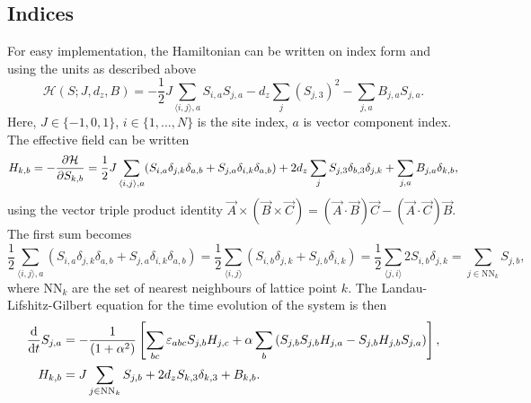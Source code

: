 \documentclass{article}
\begin{document}
    \subsection*{Indices}
    For easy implementation, the Hamiltonian can be written on index form and using the units as described above
    \begin{equation}
        \mathcal{H}(S; J, d_z, B) = -\frac{1}{2} J \sum_{\langle i, j \rangle, a} S_{i, a} S_{j, a} - d_z \sum_{j} (S_{j,3})^2 -  \sum_{j, a} B_{j, a} S_{j,a}.
        \label{hamiltonian}
    \end{equation}
    Here, $J\in\{-1, 0, 1\}$, $i\in\{1, ..., N\}$ is the site index, $a$ is vector component index.
    The effective field can be written
    \begin{align*}
        H_{k, b} = - \pdv{\mathcal{H}}{S_{k, b}} = \frac{1}{2} J \sum_{\langle i, j \rangle, a} (S_{i, a}\delta_{j,k}\delta_{a, b} + S_{j, a}\delta_{i,k}\delta_{a, b}) + 2 d_z \sum_{j} S_{j,3} \delta_{b, 3}\delta_{j, k} +  \sum_{j, a} B_{j, a} \delta_{k,b},
    \end{align*}
    using the vector triple product identity $\vec A \times (\vec B \times \vec C) = (\vec A \cdot \vec B) \vec C - (\vec A \cdot \vec C) \vec B$.
    The first sum becomes
    \begin{equation*}
        \frac{1}{2}\sum_{\langle i, j \rangle, a} (S_{i, a}\delta_{j,k}\delta_{a, b} + S_{j, a}\delta_{i,k}\delta_{a, b}) = \frac{1}{2}\sum_{\langle i, j \rangle} (S_{i, b}\delta_{j,k} + S_{j, b}\delta_{i,k}) = \frac{1}{2}\sum_{\langle j, i \rangle} 2S_{i, b} \delta_{j, k} = \sum_{j \in \mathrm{NN}_k} S_{j, b},
    \end{equation*}
    where $\mathrm{NN}_k$ are the set of nearest neighbours of lattice point $k$.
    The Landau-Lifshitz-Gilbert equation for the time evolution of the system is then
    \begin{align}
        \dv{t} S_{j, a} &= - \frac{1}{(1 + \alpha^2)}\left[\sum_{b c}\varepsilon_{abc}S_{j, b}H_{j,c} + \alpha \sum_{b}\left(S_{j, b}S_{j, b}H_{j, a} - S_{j, b}H_{j, b}S_{j, a}\right)\right], \label{LLG} \\
        H_{k, b} &= J\sum_{j \in \mathrm{NN}_k} S_{j, b} + 2d_z S_{k, 3} \delta_{k, 3} +  B_{k, b}.
        \label{effective field}
    \end{align}

    
\end{document}
